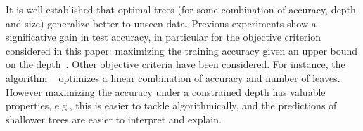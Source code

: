 \documentclass{article}
\begin{document}

It is well established that optimal trees (for some combination of accuracy, depth and size) generalize better to unseen data.
Previous experiments show a significative gain in test accuracy,
in particular for the objective criterion considered in this paper: maximizing the training accuracy given an upper bound on the depth~\cite{avellanedaefficient,bertsimas2017optimal,bertsimas2007classification,DBLP:journals/corr/abs-2007-12652,DBLP:conf/ijcai/Hu0HH20,dl8}. %
Other objective criteria have been considered. For instance, the algorithm \gosdt~\cite{NEURIPS2019_ac52c626} optimizes a linear combination of accuracy and number of leaves. However maximizing the accuracy under a constrained depth has valuable properties, e.g.,
this is easier to tackle algorithmically, and the predictions of
 shallower trees are easier to interpret and explain. 


\end{document}
